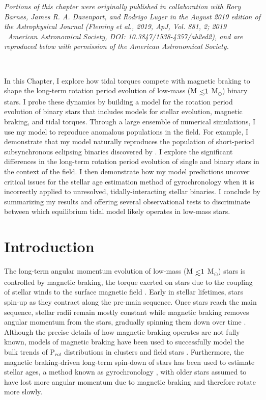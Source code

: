 \textit{Portions of this chapter were originally published in collaboration with Rory Barnes, James R. A. Davenport, and Rodrigo Luger in the August 2019 edition of the Astrophysical Journal (Fleming et al., 2019, ApJ, Vol. 881, 2; 2019 \textcopyright \ American Astronomical Society, DOI: 10.3847/1538-4357/ab2ed2), and are reproduced below with permission of the American Astronomical Society.}

\

In this Chapter, I explore how tidal torques compete with magnetic braking to shape the long-term rotation period evolution of low-mass (M$\lsim 1$ M$_{\odot}$) binary stars. I probe these dynamics by building a model for the rotation period evolution of binary stars that includes models for stellar evolution, magnetic braking, and tidal torques. Through a large ensemble of numerical simulations, I use my model to reproduce anomalous populations in the \kepler field. For example, I demonstrate that my model naturally reproduces the population of short-period subsynchronous \kepler eclipsing binaries discovered by \citet{Lurie2017}. I explore the significant differences in the long-term rotation period evolution of single and binary stars in the context of the \kepler field. I then demonstrate how my model predictions uncover critical issues for the stellar age estimation method of gyrochronology when it is incorrectly applied to unresolved, tidally-interacting stellar binaries. I conclude by summarizing my results and offering several observational tests to discriminate between which equilibrium tidal model likely operates in low-mass stars.


\section{Introduction} \label{sync:sec:intro}

The long-term angular momentum evolution of low-mass (M$\lsim 1$ M$_{\odot}$) stars is controlled by magnetic braking, the torque exerted on stars due to the coupling of stellar winds to the surface magnetic field \citep{Mestel1968}. Early in stellar lifetimes, stars spin-up as they contract along the pre-main sequence.  Once stars reach the main sequence, stellar radii remain mostly constant while magnetic braking removes angular momentum from the stars, gradually spinning them down over time \citep{Skumanich1972}. Although the precise details of how magnetic braking operates are not fully known, models of magnetic braking have been used to successfully model the bulk trends of P$_{rot}$ distributions in clusters \citep[e.g. Praesepe, ][]{Reiners2012,Matt2015,Douglas2017} and field stars \citep[e.g. the \kepler field, ][]{Matt2015,vanSaders2018}. Furthermore, the magnetic braking-driven long-term spin-down of stars has been used to estimate stellar ages, a method known as gyrochronology \citep{Skumanich1972,Barnes2003,Barnes2007,Mamajek2008,Barnes2010}, with older stars assumed to have lost more angular momentum due to magnetic braking and therefore rotate more slowly.

